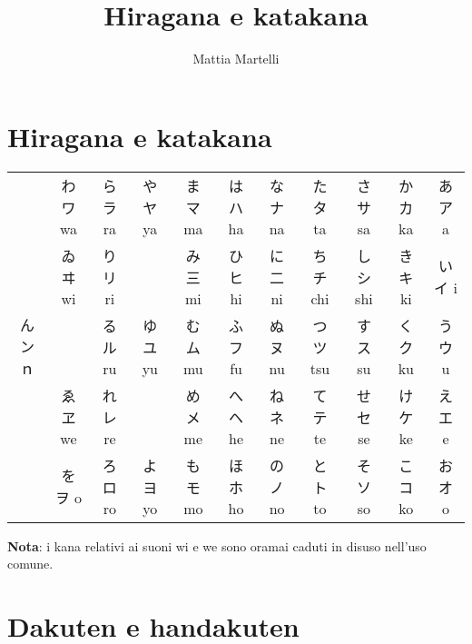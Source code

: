 \documentclass{article}
\title{Hiragana e katakana}
\author{Mattia Martelli}
\date{}
\begin{document}
    \maketitle

    \tableofcontents

    \section{Hiragana e katakana}

        \begin{center}
            \begin{japanese}
                \begin{tabular}{|c|c|c|c|c|c|c|c|c|c|c|}
                    \hline
                    \multirow{5}{*}{ん ン ｎ}
                        & わ ワ wa & ら ラ ra & や ヤ ya & ま マ ma & は ハ ha & な ナ na & た タ ta & さ サ sa & か カ ka & あ ア a\\
                        \cline{2-11}
                        & ゐ ヰ wi & り リ ri & & み 三 mi & ひ ヒ hi & に 二 ni & ち チ chi & し シ shi & き キ ki & い イ i\\
                        \cline{2-11}
                        & & る ル ru & ゆ ユ yu & む ム mu & ふ フ fu & ぬ ヌ nu & つ ツ tsu & す ス su & く ク ku & う ウ u\\
                        \cline{2-11}
                        & ゑ ヱ we & れ レ re & & め メ me & へ ヘ he & ね ネ ne & て テ te & せ セ se & け ケ ke & え エ e\\
                        \cline{2-11}
                        & を ヲ o & ろ ロ ro & よ ヨ yo & も モ mo & ほ ホ ho & の ノ no & と ト to & そ ソ so & こ コ ko & お オ o\\
                    \hline
                \end{tabular}
            \end{japanese}
        \end{center}

        \textbf{Nota}: i kana relativi ai suoni \textjapanese{wi} e \textjapanese{we} sono oramai caduti in disuso nell'uso comune.
    
    \section{Dakuten e handakuten}
\end{document}
